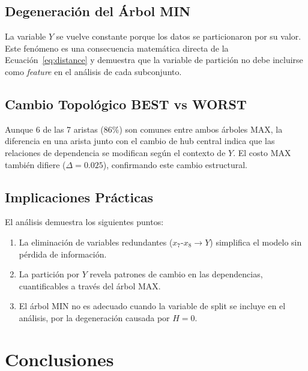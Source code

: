 \documentclass[12pt, a4paper]{article}
\begin{document}
\subsection{Degeneración del Árbol MIN}

La variable $Y$ se vuelve constante porque los datos se particionaron
por su valor. Este fenómeno es una consecuencia matemática directa de la
Ecuación~\ref{eq:distance} y demuestra que la variable de partición no
debe incluirse como \textit{feature} en el análisis de cada subconjunto.

\subsection{Cambio Topológico BEST vs WORST}

Aunque 6 de las 7 aristas (86\%) son comunes entre ambos árboles MAX,
la diferencia en una arista junto con el cambio de hub central indica
que las relaciones de dependencia se modifican según el contexto de $Y$.
El costo MAX también difiere ($\Delta = 0.025$), confirmando este cambio
estructural.

\subsection{Implicaciones Prácticas}

El análisis demuestra los siguientes puntos:

\begin{enumerate}
    \item La eliminación de variables redundantes ($x_7$-$x_8 \to Y$)
          simplifica el modelo sin pérdida de información.
    \item La partición por $Y$ revela patrones de cambio en las
          dependencias, cuantificables a través del árbol MAX.
    \item El árbol MIN no es adecuado cuando la variable de split
          se incluye en el análisis, por la degeneración causada
          por $H = 0$.
\end{enumerate}

\section{Conclusiones}
\end{document}
